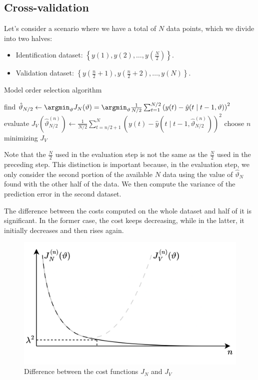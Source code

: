 \subsection{Cross-validation}
Let's consider a scenario where we have a total of $N$ data points, which we divide into two halves:
\begin{itemize}
    \item Identification dataset: $\left\{ y(1),y(2),\dots,y(\frac{N}{2}) \right\}$. 
    \item Validation dataset: $\left\{ y\left(\frac{n}{2}+1\right),y\left(\frac{n}{2}+2\right),\dots,y(N) \right\}$. 
\end{itemize}
\begin{algorithm}[H]
    \caption{Model order selection algorithm}
        \begin{algorithmic}[1]
                \State find $\hat{\vartheta}_{N/2}\leftarrow\argmin_{\vartheta} J_N(\vartheta)=\argmin_{\vartheta}\frac{1}{N/2}\sum_{t=1}^{N/2}\left( y(t)-\hat{y}(t\mid t-1,\vartheta) \right)^2$
                \State evaluate $J_V\left(\hat{\vartheta}_{N/2}^{(n)}\right) \leftarrow \frac{1}{N/2}\sum_{t=n/2+1}^{N}\left( y(t)-\hat{y}(t\mid t-1,\hat{\vartheta}_{N/2}^{(n)}) \right)^2$
            \EndFor
            \State choose $n$ minimizing $J_V$
        \end{algorithmic}
\end{algorithm}
Note that the $\frac{N}{2}$ used in the evaluation step is not the same as the $\frac{N}{2}$ used in the preceding step. 
This distinction is important because, in the evaluation step, we only consider the second portion of the available $N$ data using the value of $\hat{\vartheta}_N$ found with the other half of the data. 
We then compute the variance of the prediction error in the second dataset.

The difference between the costs computed on the whole dataset and half of it is significant. 
In the former case, the cost keeps decreasing, while in the latter, it initially decreases and then rises again.
\begin{figure}[H]
    \centering
    \includegraphics[width=0.54\linewidth]{images/fitting1.png}
    \caption{Difference between the cost functions $J_N$ and $J_V$}
\end{figure}

